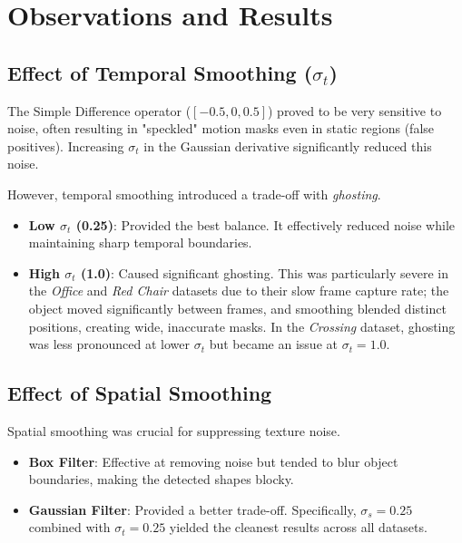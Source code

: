\documentclass[11pt, twocolumn]{article}
\begin{document}
\section{Observations and Results}

\subsection{Effect of Temporal Smoothing ($\sigma_t$)}
The Simple Difference operator ($[-0.5, 0, 0.5]$) proved to be very sensitive to noise, often resulting in "speckled" motion masks even in static regions (false positives). Increasing $\sigma_t$ in the Gaussian derivative significantly reduced this noise. 

However, temporal smoothing introduced a trade-off with \textit{ghosting}.
\begin{itemize}
    \item \textbf{Low $\sigma_t$ (0.25)}: Provided the best balance. It effectively reduced noise while maintaining sharp temporal boundaries.
    \item \textbf{High $\sigma_t$ (1.0)}: Caused significant ghosting. This was particularly severe in the \textit{Office} and \textit{Red Chair} datasets due to their slow frame capture rate; the object moved significantly between frames, and smoothing blended distinct positions, creating wide, inaccurate masks. In the \textit{Crossing} dataset, ghosting was less pronounced at lower $\sigma_t$ but became an issue at $\sigma_t=1.0$.
\end{itemize}

\subsection{Effect of Spatial Smoothing}
Spatial smoothing was crucial for suppressing texture noise.
\begin{itemize}
    \item \textbf{Box Filter}: Effective at removing noise but tended to blur object boundaries, making the detected shapes blocky.
    \item \textbf{Gaussian Filter}: Provided a better trade-off. Specifically, $\sigma_s=0.25$ combined with $\sigma_t=0.25$ yielded the cleanest results across all datasets.
\end{itemize}
\end{document}
